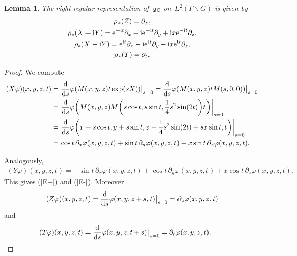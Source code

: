 \documentclass[pdftex]{sigma}
\newcommand\fg{{\frak{g}}}
\numberwithin{equation}{section}
\newtheorem{Lemma}[Theorem]{Lemma}
\begin{document}
\begin{Lemma}\label{Lrep}
The right regular representation of~$\fg_{\mathbb C}$ on~$L^2(\Gamma\backslash G)$ is given by
\begin{gather}
\rho_*(Z)=\partial_z \label{EZ},
\\
\rho_*(X+{\rm i}Y)={\rm e}^{-{\rm i}t}\partial_x +{\rm i}{\rm e}^{-{\rm i}t} \partial_y +{\rm i}x {\rm e}^{-{\rm i}t} \partial_z \label{E+},
\\
\rho_*(X-{\rm i}Y)={\rm e}^{{\rm i}t}\partial_x -{\rm i}{\rm e}^{{\rm i}t} \partial_y -{\rm i}x {\rm e}^{{\rm i}t} \partial_z \label{E-},
\\
\rho_*(T)=\partial_t. \label{ET}
\end{gather}
\end{Lemma}
\begin{proof}
We compute
\begin{align*}
(X\varphi)(x,y,z,t)&=\frac{\rm d}{{\rm d} s}\varphi(M(x,y,z)t\exp(sX))\big|_{s=0}
=\frac{\rm d}{{\rm d} s}\varphi(M(x,y,z)t M(s,0,0))\big|_{s=0}
\\
&=\frac{\rm d}{{\rm d} s}\varphi\bigg(M(x,y,z)M\bigg(s\cos t,s\sin t, \frac{1}{4}s^2\sin(2t)\bigg)t\bigg)\bigg|_{s=0}
\\
&=\frac{\rm d}{{\rm d} s}\varphi\bigg(x+s\cos t,y+s\sin t,z+ \frac{1}{4}s^2\sin(2t)+sx\sin t,t\bigg)\bigg|_{s=0}
\\
&=\cos t\,\partial_x \varphi(x,y,z,t) +\sin t\,\partial_y\varphi(x,y,z,t) +x\sin t\, \partial_z \varphi(x,y,z,t).
\end{align*}

Analogously,
\begin{gather*}
(Y\varphi)(x,y,z,t)
=-\sin t\,\partial_x\varphi(x,y,z,t) +\cos t\,\partial_y\varphi(x,y,z,t) +x\cos t\,\partial_z\varphi(x,y,z,t).
\end{gather*}
This gives (\ref{E+}) and (\ref{E-}).
Moreover
\begin{gather*}
(Z\varphi)(x,y,z,t)
=\frac{\rm d}{{\rm d} s}\varphi(x,y,z+s,t)\big|_{s=0}=\partial_z\varphi(x,y,z,t)
\end{gather*}
and
\begin{gather*}
(T\varphi)(x,y,z,t)
=\frac{\rm d}{{\rm d} s}\varphi(x,y,z,t+s)\big|_{s=0}=\partial_t\varphi(x,y,z,t).
\tag*{\qed}
\end{gather*}
\renewcommand{\qed}{}
\end{proof}
\end{document}
